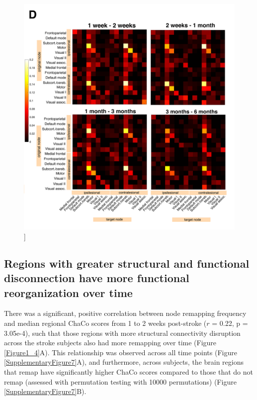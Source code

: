 \documentclass[phd,tocprelim]{cornell}
\renewcommand{\caption}[1]{\singlespacing\hangcaption{#1}\normalspacing}
\begin{document}
\null
\vfill
\clearpage
\null
\vfill
\begin{figure}[h!]
		\ContinuedFloat
		\captionsetup{labelformat=adja-page}
    \centering
    \includegraphics[width=\textwidth]{chapter1/Figure3D.png}
    \caption[]{}
\end{figure}
\null
\vfill
\clearpage

	\subsection{Regions with greater structural and functional disconnection  have more functional reorganization over time}
	There was a significant, positive correlation between node remapping frequency and median regional ChaCo scores from 1 to 2 weeks post-stroke ($r$ = 0.22, p = 3.05e-4), such that those regions with more structural connectivity disruption across the stroke subjects also had more remapping over time (Figure \ref{Figure1_4}A). This relationship was observed across all time points (Figure \ref{SupplementaryFigure7}A), and furthermore, across subjects, the brain regions that remap have significantly higher ChaCo scores compared to those that do not remap (assessed with permutation testing with 10000 permutations) (Figure \ref{SupplementaryFigure7}B).
	
\end{document}
